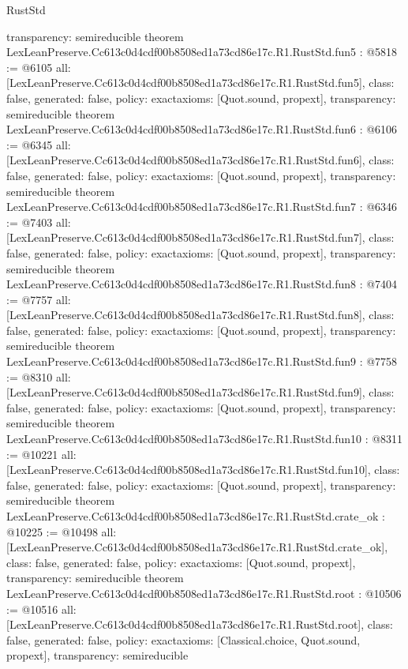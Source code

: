 \begin{lexlean}{RustStd}
\begin{coremodule}
{  transparency: semireducible
}
theorem LexLeanPreserve.Cc613c0d4cdf00b8508ed1a73cd86e17c.R1.RustStd.fun5 : @5818 := @6105 {
  all: [LexLeanPreserve.Cc613c0d4cdf00b8508ed1a73cd86e17c.R1.RustStd.fun5],
  class: false,
  generated: false,
  policy: exact{axioms: [Quot.sound, propext]},
  transparency: semireducible
}
theorem LexLeanPreserve.Cc613c0d4cdf00b8508ed1a73cd86e17c.R1.RustStd.fun6 : @6106 := @6345 {
  all: [LexLeanPreserve.Cc613c0d4cdf00b8508ed1a73cd86e17c.R1.RustStd.fun6],
  class: false,
  generated: false,
  policy: exact{axioms: [Quot.sound, propext]},
  transparency: semireducible
}
theorem LexLeanPreserve.Cc613c0d4cdf00b8508ed1a73cd86e17c.R1.RustStd.fun7 : @6346 := @7403 {
  all: [LexLeanPreserve.Cc613c0d4cdf00b8508ed1a73cd86e17c.R1.RustStd.fun7],
  class: false,
  generated: false,
  policy: exact{axioms: [Quot.sound, propext]},
  transparency: semireducible
}
theorem LexLeanPreserve.Cc613c0d4cdf00b8508ed1a73cd86e17c.R1.RustStd.fun8 : @7404 := @7757 {
  all: [LexLeanPreserve.Cc613c0d4cdf00b8508ed1a73cd86e17c.R1.RustStd.fun8],
  class: false,
  generated: false,
  policy: exact{axioms: [Quot.sound, propext]},
  transparency: semireducible
}
theorem LexLeanPreserve.Cc613c0d4cdf00b8508ed1a73cd86e17c.R1.RustStd.fun9 : @7758 := @8310 {
  all: [LexLeanPreserve.Cc613c0d4cdf00b8508ed1a73cd86e17c.R1.RustStd.fun9],
  class: false,
  generated: false,
  policy: exact{axioms: [Quot.sound, propext]},
  transparency: semireducible
}
theorem LexLeanPreserve.Cc613c0d4cdf00b8508ed1a73cd86e17c.R1.RustStd.fun10 : @8311 := @10221 {
  all: [LexLeanPreserve.Cc613c0d4cdf00b8508ed1a73cd86e17c.R1.RustStd.fun10],
  class: false,
  generated: false,
  policy: exact{axioms: [Quot.sound, propext]},
  transparency: semireducible
}
theorem LexLeanPreserve.Cc613c0d4cdf00b8508ed1a73cd86e17c.R1.RustStd.crate_ok : @10225 := @10498 {
  all: [LexLeanPreserve.Cc613c0d4cdf00b8508ed1a73cd86e17c.R1.RustStd.crate_ok],
  class: false,
  generated: false,
  policy: exact{axioms: [Quot.sound, propext]},
  transparency: semireducible
}
theorem LexLeanPreserve.Cc613c0d4cdf00b8508ed1a73cd86e17c.R1.RustStd.root : @10506 := @10516 {
  all: [LexLeanPreserve.Cc613c0d4cdf00b8508ed1a73cd86e17c.R1.RustStd.root],
  class: false,
  generated: false,
  policy: exact{axioms: [Classical.choice, Quot.sound, propext]},
  transparency: semireducible
}


\end{coremodule}
\end{lexlean}
